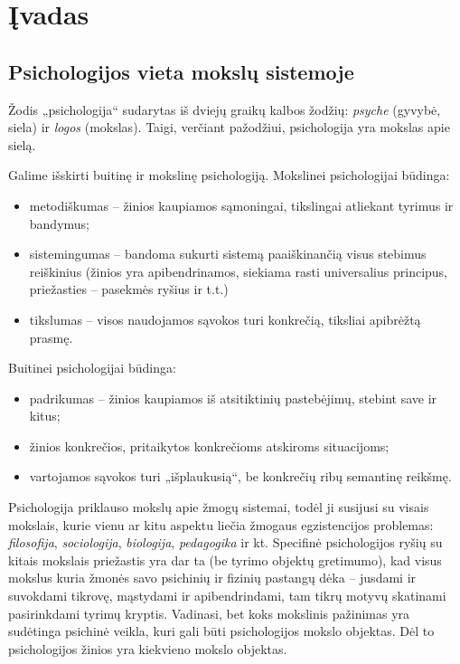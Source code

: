 \chapter{Įvadas}

\section{Psichologijos vieta mokslų sistemoje}

\label{tema:psichologijos_mokslas}

Žodis „\gls{psichologija}“ sudarytas iš dviejų graikų kalbos žodžių: 
\emph{psyche} (gyvybė, \gls{siela}) ir \emph{logos} (mokslas). Taigi, 
verčiant pažodžiui, \gls{psichologija} yra mokslas apie sielą.

Galime išskirti buitinę ir mokslinę psichologiją. Mokslinei psichologijai
būdinga:
\begin{itemize}
  \item metodiškumas – žinios kaupiamos sąmoningai, tikslingai atliekant
    tyrimus ir bandymus;
  \item sistemingumas – bandoma sukurti sistemą paaiškinančią visus 
    stebimus reiškinius (žinios yra apibendrinamos, siekiama rasti 
    universalius principus, priežasties – pasekmės ryšius ir t.t.)
  \item tikslumas – visos naudojamos sąvokos turi konkrečią, tiksliai
    apibrėžtą prasmę.
\end{itemize}
Buitinei psichologijai būdinga:
\begin{itemize}
  \item padrikumas – žinios kaupiamos iš atsitiktinių pastebėjimų, 
    stebint save ir kitus;
  \item žinios konkrečios, pritaikytos konkrečioms atskiroms situacijoms;
  \item vartojamos sąvokos turi „išplaukusią“, be konkrečių ribų 
    semantinę reikšmę.
\end{itemize}

Psichologija priklauso mokslų apie žmogų sistemai, todėl ji susijusi su
visais mokslais, kurie vienu ar kitu aspektu liečia žmogaus egzistencijos 
problemas: \emph{filosofija}, \emph{sociologija}, \emph{biologija},
\emph{pedagogika} ir kt. Specifinė psichologijos ryšių su kitais mokslais
priežastis yra dar ta (be tyrimo objektų gretimumo), kad visus mokslus
kuria žmonės savo psichinių ir fizinių pastangų dėka – jusdami ir suvokdami
tikrovę, mąstydami ir apibendrindami, tam tikrų motyvų skatinami 
pasirinkdami tyrimų kryptis. Vadinasi, bet koks mokslinis pažinimas yra 
sudėtinga psichinė veikla, kuri gali būti psichologijos mokslo objektas.
Dėl to psichologijos žinios yra kiekvieno mokslo objektas.


